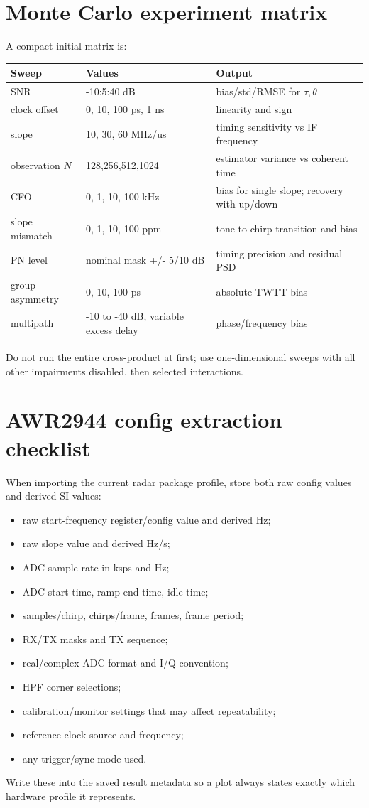 \documentclass[11pt]{article}
\begin{document}
\section{Monte Carlo experiment matrix}
A compact initial matrix is:
\begin{longtable}{p{}p{}p{}}
\toprule Sweep & Values & Output \\ \midrule
SNR & -10:5:40 dB & bias/std/RMSE for $\tau,\theta$ \\
clock offset & 0, 10, 100 ps, 1 ns & linearity and sign \\
slope & 10, 30, 60 MHz/us & timing sensitivity vs IF frequency \\
observation $N$ & 128,256,512,1024 & estimator variance vs coherent time \\
CFO & 0, 1, 10, 100 kHz & bias for single slope; recovery with up/down \\
slope mismatch & 0, 1, 10, 100 ppm & tone-to-chirp transition and bias \\
PN level & nominal mask +/- 5/10 dB & timing precision and residual PSD \\
group asymmetry & 0, 10, 100 ps & absolute TWTT bias \\
multipath & -10 to -40 dB, variable excess delay & phase/frequency bias \\
\bottomrule
\end{longtable}
Do not run the entire cross-product at first; use one-dimensional sweeps with all other impairments disabled, then selected interactions.

\section{AWR2944 config extraction checklist}
When importing the current radar package profile, store both raw config values and derived SI values:
\begin{itemize}
\item raw start-frequency register/config value and derived Hz;
\item raw slope value and derived Hz/s;
\item ADC sample rate in ksps and Hz;
\item ADC start time, ramp end time, idle time;
\item samples/chirp, chirps/frame, frames, frame period;
\item RX/TX masks and TX sequence;
\item real/complex ADC format and I/Q convention;
\item HPF corner selections;
\item calibration/monitor settings that may affect repeatability;
\item reference clock source and frequency;
\item any trigger/sync mode used.
\end{itemize}
Write these into the saved result metadata so a plot always states exactly which hardware profile it represents.
\end{document}
